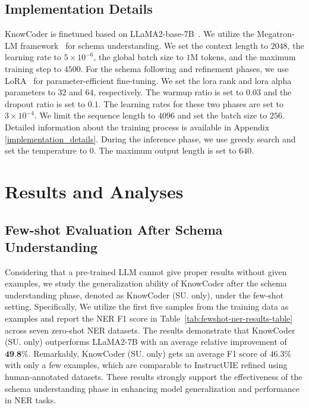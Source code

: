 \subsection{Implementation Details}

KnowCoder is finetuned based on LLaMA2-base-7B~\cite{touvron2023llama2}. We
utilize the Megatron-LM framework~\cite{shoeybi2019megatron} for schema
understanding. We set the context length to $2048$, the learning rate to $5
\times 10^{-6}$, the global batch size to $1$M tokens, and the maximum training
step to $4500$. For the schema following and refinement phases, we use
LoRA~\cite{hu2021lora} for parameter-efficient fine-tuning. We set the lora rank
and lora alpha parameters to $32$ and $64$, respectively. The warmup ratio is
set to $0.03$ and the dropout ratio is set to $0.1$. The learning rates for
these two phases are set to $3 \times 10^{-4}$. We limit the sequence length to
$4096$ and set the batch size to $256$. Detailed information about the training
process is available in Appendix \ref{implementation_details}. During the
inference phase, we use greedy search and set the temperature to $0$. The
maximum output length is set to $640$.

\section{Results and Analyses}

\subsection{Few-shot Evaluation After Schema Understanding}

Considering that a pre-trained LLM cannot give proper results without given examples, we study the generalization ability of KnowCoder after the schema understanding phase, denoted as KnowCoder (SU. only), under the few-shot setting. Specifically, We utilize the first five samples from the training data as examples and report the NER F1 score in Table~\ref{tab:fewshot-ner-results-table} across seven zero-shot NER datasets. The results demonstrate that KnowCoder (SU. only) outperforms LLaMA2-7B with an average relative improvement of $\textbf{49.8\%}$. Remarkably, KnowCoder (SU. only) gets an average F1 score of $46.3\%$ with only a few examples, which are comparable to InstructUIE refined using human-annotated datasets. These results strongly support the effectiveness of the schema understanding phase in enhancing model generalization and performance in NER tasks.

